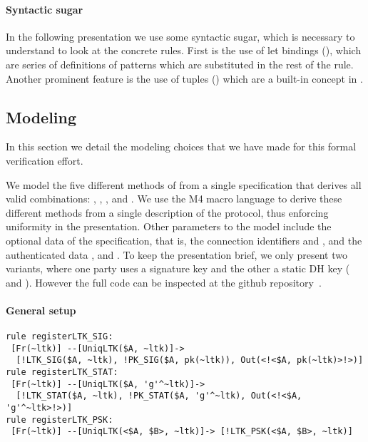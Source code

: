 \paragraph{Syntactic sugar} In the following presentation we use some syntactic
sugar, which is necessary to understand to look at the concrete rules. First is
the use of let bindings (), which are series of
definitions of patterns which are substituted in the rest of the rule. Another
prominent feature is the use of tuples () which are a
built-in concept in \mTamarin.

\subsection{Modeling \mEdhoc{}}
In this section we detail the modeling choices that we have made for this formal
verification effort.

We model the five different methods of \mEdhoc{} from a single specification
that derives all valid combinations: \mPskPsk, \mSigSig, \mSigStat, \mStatSig{}
and \mStatStat.
%
We use the M4 macro language to derive these different methods from a single
description of the protocol, thus enforcing uniformity in the presentation.
%
Other parameters to the model include the optional data of the \mEdhoc{}
specification, that is, the connection identifiers \mCi{} and \mCr{}, and
the authenticated data \mADone, \mADtwo{} and \mADthree.
%
To keep the presentation brief, we
only present two variants, where one party uses a signature key and the other a static DH key (\mSigStat{} and \mStatSig).
However the full code can be inspected at the github
repository~\cite{edhocTamarinRepo}.


\paragraph{General setup}
\begin{lstlisting}
rule registerLTK_SIG:
 [Fr(~ltk)] --[UniqLTK($A, ~ltk)]->
  [!LTK_SIG($A, ~ltk), !PK_SIG($A, pk(~ltk)), Out(<!<$A, pk(~ltk)>!>)]
rule registerLTK_STAT:
 [Fr(~ltk)] --[UniqLTK($A, 'g'^~ltk)]->
  [!LTK_STAT($A, ~ltk), !PK_STAT($A, 'g'^~ltk), Out(<!<$A, 'g'^~ltk>!>)]
rule registerLTK_PSK:
 [Fr(~ltk)] --[UniqLTK(<$A, $B>, ~ltk)]-> [!LTK_PSK(<$A, $B>, ~ltk)]
\end{lstlisting}
    
